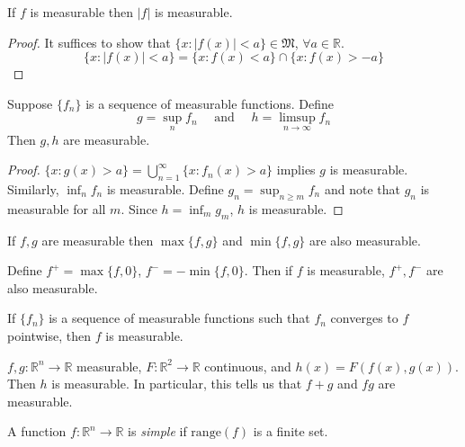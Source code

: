 \documentclass[11pt]{article}
\begin{document}
\begin{theorem}
    If $f$ is measurable then $|f|$ is measurable. 
\end{theorem}
\begin{proof}
    It suffices to show that $\{ x : |f(x)| < a \} \in \mathfrak{M}$, $\forall a \in \mathbb{R}$. $$\{ x : |f(x)  | < a \} = \{ x : f(x) < a \} \cap \{ x : f(x) > -a \}$$
\end{proof}

\begin{theorem}
    Suppose $\{ f_n \}$ is a sequence of measurable functions. Define $$g = \sup_n f_n \quad \text{ and } \quad h = \limsup_{n \to \infty} f_n$$ Then $g, h$ are measurable. 
\end{theorem}
\begin{proof}
    $\{ x : g(x) > a \} = \bigcup_{n = 1}^\infty \{ x : f_n(x) > a \} $ implies $ g$ is measurable. Similarly, $\inf_n f_n$ is measurable. Define $g_n = \sup_{n \ge m} f_n$ and note that $g_n$ is measurable for all $m$. Since $h = \inf_m g_m$, $h$ is measurable. 
\end{proof}

\begin{corollary}
     If $f, g$ are measurable then $\max\{ f, g \}$ and $\min \{ f, g \}$ are also measurable.
\end{corollary}

\begin{corollary}
    Define $f^+ = \max \{ f, 0 \}$, $f^- = - \min \{ f, 0 \}$. Then if $f$ is measurable, $f^+, f^-$ are also measurable.
\end{corollary}

\begin{corollary}
    If $\{ f_n \}$ is a sequence of measurable functions such that $f_n$ converges to $f$ pointwise, then $f$ is measurable. 
\end{corollary}

\begin{theorem}
    $f, g: \mathbb{R}^n \to \mathbb{R}$ measurable, $F: \mathbb{R}^2 \to \mathbb{R}$ continuous, and $h(x) = F(f(x), g(x))$. Then $h$ is measurable. In particular, this tells us that $f + g$ and $fg$ are measurable. 
\end{theorem}

\begin{definition}
    A function $f: \mathbb{R}^n \to \mathbb{R}$ is \emph{simple} if $\mathrm{range}(f)$ is a finite set.
\end{definition}
\end{document}
